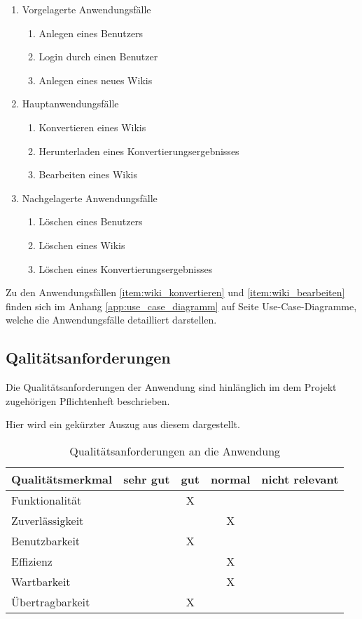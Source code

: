 \documentclass[12pt, xcolor=dvipsnames]{scrartcl}
\begin{document}
\begin{enumerate}
	\item Vorgelagerte Anwendungsfälle
	\begin{enumerate}
		\item Anlegen eines Benutzers		
		\item Login durch einen Benutzer
		\item Anlegen eines neues Wikis	
	\end{enumerate}
	\item Hauptanwendungsfälle
	\begin{enumerate}
		\item Konvertieren eines Wikis \label{item:wiki_konvertieren}
		\item Herunterladen eines Konvertierungsergebnisses
		\item Bearbeiten eines Wikis \label{item:wiki_bearbeiten}
	\end{enumerate}
	\item Nachgelagerte Anwendungsfälle
	\begin{enumerate}
		\item Löschen eines Benutzers
		\item Löschen eines Wikis
		\item Löschen eines Konvertierungsergebnisses
	\end{enumerate}
\end{enumerate}

Zu den Anwendungsfällen \ref{item:wiki_konvertieren} und \ref{item:wiki_bearbeiten} finden sich im Anhang \ref{app:use_case_diagramm} auf Seite \pageref{app:use_case_diagramm} Use-Case-Diagramme, welche die Anwendungsfälle detailliert darstellen.


\subsection{Qalitätsanforderungen}

Die Qualitätsanforderungen der Anwendung sind hinlänglich im dem Projekt zugehörigen Pflichtenheft beschrieben.

Hier wird ein gekürzter Auszug aus diesem dargestellt.

\begin{table}[H]
	\centering
	\begin{tabular}{lcccc}
	
	\rowcolor{white!15}
		\textbf{Qualitätsmerkmal} & \textbf{sehr gut} & \textbf{gut} & \textbf{normal} 
		& \textbf{nicht relevant}\\\hline
		

		Funktionalität 		&	& X	&	&	\\
		Zuverlässigkeit 	&	&	& X	&	\\
		Benutzbarkeit 		&	& X	&	&	\\
		Effizienz	 		&	&	& X	&	\\
		Wartbarkeit 		&	&	& X	&	\\
		Übertragbarkeit 	&	& X	&	&	\\
	\end{tabular}	
	
	\caption{Qualitätsanforderungen an die Anwendung}
	\label{tab:qualitätsanforderungen}
\end{table}
\end{document}
